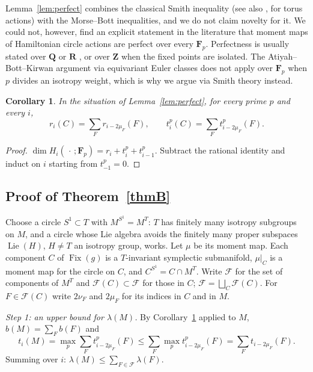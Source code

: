 \documentclass[11pt]{amsart}
\numberwithin{equation}{section}
\newtheorem{corollary}[theorem]{Corollary}
\theoremstyle{definition}
\theoremstyle{remark}
\newcommand{\Z}{\mathbf Z}
\newcommand{\Q}{\mathbf Q}
\newcommand{\R}{\mathbf R}
\newcommand{\F}{\mathbf F}
\DeclareMathOperator{\Fix}{Fix}
\begin{document}
Lemma~\ref{lem:perfect} combines the classical Smith inequality (see
also \cite[Ch.~3]{AlldayPuppe1993}, \cite[Ch.~III]{Hsiang1975} for torus
actions) with the Morse--Bott inequalities, and we do not claim novelty
for it. We could not, however, find an explicit statement in the
literature that moment maps of Hamiltonian circle actions are perfect over
every $\F_p$. Perfectness is usually stated over $\Q$ or $\R$
\cite{Frankel1959,Kirwan1984}, or over $\Z$ when the fixed points are
isolated. The Atiyah--Bott--Kirwan argument via equivariant Euler classes
does not apply over $\F_p$ when $p$ divides an isotropy weight, which is
why we argue via Smith theory instead.

\begin{corollary}\label{cor:torsionformula}
In the situation of Lemma~\ref{lem:perfect}, for every prime $p$ and every
$i$,
\[
  r_i(C)=\sum_Fr_{i-2\mu_F}(F),\qquad
  t^p_i(C)=\sum_Ft^p_{i-2\mu_F}(F).
\]
\end{corollary}

\begin{proof}
$\dim H_i(\,\cdot\,;\F_p)=r_i+t^p_i+t^p_{i-1}$. Subtract the rational
identity and induct on $i$ starting from $t^p_{-1}=0$.
\end{proof}

\subsection{Proof of Theorem~\ref{thmB}}

Choose a circle $S^1\subset T$ with $M^{S^1}=M^T$: $T$ has finitely many
isotropy subgroups on $M$, and a circle whose Lie algebra avoids the
finitely many proper subspaces $\operatorname{Lie}(H)$, $H\ne T$ an
isotropy group, works. Let $\mu$ be its moment map. Each component $C$ of
$\Fix(g)$ is a $T$-invariant symplectic submanifold, $\mu|_C$ is a moment map
for the circle on $C$, and $C^{S^1}=C\cap M^T$. Write $\mathcal F$ for the
set of components of $M^T$ and $\mathcal F(C)\subset\mathcal F$ for those in
$C$; $\mathcal F=\bigsqcup_C\mathcal F(C)$. For $F\in\mathcal F(C)$ write
$2\nu_F$ and $2\mu_F$ for its indices in $C$ and in $M$.

\emph{Step 1: an upper bound for $\lambda(M)$.} By
Corollary~\ref{cor:torsionformula} applied to $M$,
$b(M)=\sum_{F}b(F)$ and
\[
  t_i(M)=\max_p\sum_Ft^p_{i-2\mu_F}(F)\le\sum_F\max_pt^p_{i-2\mu_F}(F)
  =\sum_Ft_{i-2\mu_F}(F).
\]
Summing over $i$: $\lambda(M)\le\sum_{F\in\mathcal F}\lambda(F)$.
\end{document}
